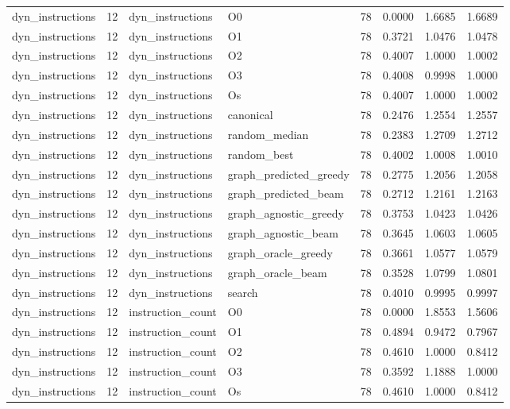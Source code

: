 \begin{table}[t]
\begin{tabular}{lrllrrrr}
dyn\_instructions & 12 & dyn\_instructions & O0 & 78 & 0.0000 & 1.6685 & 1.6689 \\
dyn\_instructions & 12 & dyn\_instructions & O1 & 78 & 0.3721 & 1.0476 & 1.0478 \\
dyn\_instructions & 12 & dyn\_instructions & O2 & 78 & 0.4007 & 1.0000 & 1.0002 \\
dyn\_instructions & 12 & dyn\_instructions & O3 & 78 & 0.4008 & 0.9998 & 1.0000 \\
dyn\_instructions & 12 & dyn\_instructions & Os & 78 & 0.4007 & 1.0000 & 1.0002 \\
dyn\_instructions & 12 & dyn\_instructions & canonical & 78 & 0.2476 & 1.2554 & 1.2557 \\
dyn\_instructions & 12 & dyn\_instructions & random\_median & 78 & 0.2383 & 1.2709 & 1.2712 \\
dyn\_instructions & 12 & dyn\_instructions & random\_best & 78 & 0.4002 & 1.0008 & 1.0010 \\
dyn\_instructions & 12 & dyn\_instructions & graph\_predicted\_greedy & 78 & 0.2775 & 1.2056 & 1.2058 \\
dyn\_instructions & 12 & dyn\_instructions & graph\_predicted\_beam & 78 & 0.2712 & 1.2161 & 1.2163 \\
dyn\_instructions & 12 & dyn\_instructions & graph\_agnostic\_greedy & 78 & 0.3753 & 1.0423 & 1.0426 \\
dyn\_instructions & 12 & dyn\_instructions & graph\_agnostic\_beam & 78 & 0.3645 & 1.0603 & 1.0605 \\
dyn\_instructions & 12 & dyn\_instructions & graph\_oracle\_greedy & 78 & 0.3661 & 1.0577 & 1.0579 \\
dyn\_instructions & 12 & dyn\_instructions & graph\_oracle\_beam & 78 & 0.3528 & 1.0799 & 1.0801 \\
dyn\_instructions & 12 & dyn\_instructions & search & 78 & 0.4010 & 0.9995 & 0.9997 \\
dyn\_instructions & 12 & instruction\_count & O0 & 78 & 0.0000 & 1.8553 & 1.5606 \\
dyn\_instructions & 12 & instruction\_count & O1 & 78 & 0.4894 & 0.9472 & 0.7967 \\
dyn\_instructions & 12 & instruction\_count & O2 & 78 & 0.4610 & 1.0000 & 0.8412 \\
dyn\_instructions & 12 & instruction\_count & O3 & 78 & 0.3592 & 1.1888 & 1.0000 \\
dyn\_instructions & 12 & instruction\_count & Os & 78 & 0.4610 & 1.0000 & 0.8412 \\

\end{tabular}
\end{table}
